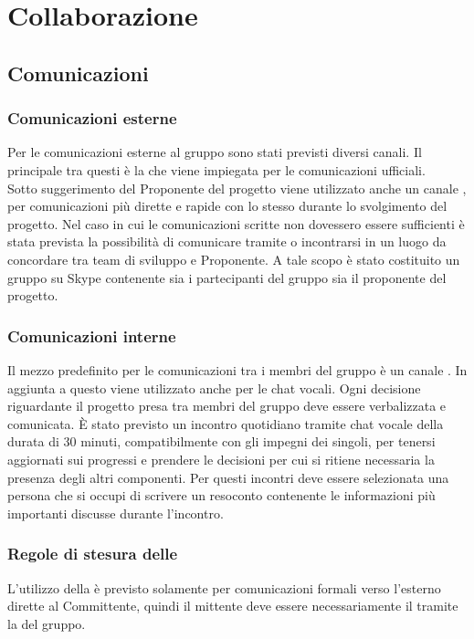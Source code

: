 \section{Collaborazione}

\subsection{Comunicazioni}

\subsubsection{Comunicazioni esterne}
Per le comunicazioni esterne al gruppo sono stati previsti diversi canali.
Il principale tra questi è la \email{} \href{mailto:\GroupEmail}{\GroupEmail}{} che viene impiegata per le comunicazioni ufficiali.\\
Sotto suggerimento del Proponente del progetto viene utilizzato anche un canale , per comunicazioni più dirette e rapide con lo stesso durante lo svolgimento del progetto. Nel caso in cui le comunicazioni scritte non dovessero essere sufficienti è stata prevista la possibilità di comunicare tramite  o incontrarsi in un luogo da concordare tra team di sviluppo e Proponente. A tale scopo è stato costituito un gruppo su Skype contenente sia i partecipanti del gruppo sia il proponente del progetto.

\subsubsection{Comunicazioni interne} \label{sec:comunicazioni_interne}
Il mezzo predefinito per le comunicazioni tra i membri del gruppo è un canale .
In aggiunta a questo viene utilizzato anche  per le chat vocali.
Ogni decisione riguardante il progetto presa tra membri del gruppo deve essere verbalizzata e comunicata.
\`{E} stato previsto un incontro quotidiano tramite chat vocale della durata di 30 minuti, compatibilmente con gli impegni dei singoli, per tenersi aggiornati sui progressi e prendere le decisioni per cui si ritiene necessaria la presenza degli altri componenti. Per questi incontri deve essere selezionata una persona che si occupi di scrivere un resoconto contenente le informazioni più importanti discusse durante l'incontro.

\subsubsection{Regole di stesura delle \email}
L'utilizzo della \email{} è previsto solamente per comunicazioni formali verso l'esterno dirette al Committente, quindi il mittente deve essere necessariamente il \Responsabile{} tramite la \email{} del gruppo.

